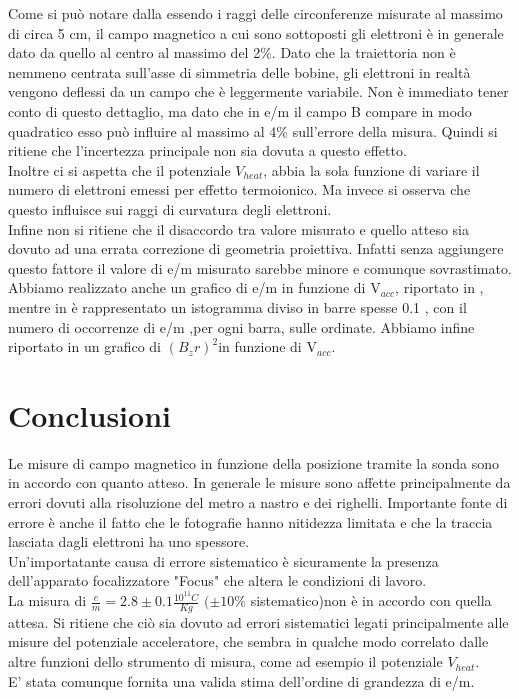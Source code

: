 Come si può notare dalla  essendo i raggi delle circonferenze misurate al massimo di circa 5 cm, il campo magnetico a cui sono sottoposti gli elettroni è in generale dato da quello al centro al massimo del 2\%. Dato che la traiettoria non è nemmeno centrata sull'asse di simmetria delle bobine, gli elettroni in realtà vengono deflessi da un campo che è leggermente variabile. Non è immediato tener conto di questo dettaglio, ma dato che in e/m il campo B compare in modo quadratico esso può influire al massimo al 4\% sull'errore della misura. Quindi si ritiene che l'incertezza principale non sia dovuta a questo effetto. \\
Inoltre ci si aspetta che il potenziale $V_{heat}$, abbia la sola funzione di variare il numero di elettroni emessi per effetto termoionico. Ma invece si osserva che questo influisce sui raggi di curvatura degli elettroni.\\
Infine non si ritiene che il disaccordo tra valore misurato e quello atteso sia dovuto ad una errata correzione di geometria proiettiva. Infatti senza aggiungere questo fattore il valore di e/m misurato sarebbe minore e comunque sovrastimato.
Abbiamo realizzato anche un grafico di e/m in funzione di V$_{acc}$, riportato in , mentre in  è rappresentato un istogramma diviso in barre spesse 0.1 , con il numero di occorrenze di e/m ,per ogni barra, sulle ordinate. Abbiamo infine riportato in  un grafico di ${(B_z r)}^2$in funzione di V$_{acc}$.

\section{Conclusioni}
Le misure di campo magnetico in funzione della posizione tramite la sonda sono in accordo con quanto atteso.
In generale le misure sono affette principalmente da errori dovuti alla risoluzione del metro a nastro e dei righelli. Importante fonte di errore è anche il fatto che le fotografie hanno nitidezza limitata e che la traccia lasciata dagli elettroni ha uno spessore.\\
Un'importatante causa di errore sistematico è sicuramente la presenza dell'apparato focalizzatore "Focus" che altera le condizioni di lavoro.\\
La misura di $\frac{e}{m} = 2.8 \pm 0.1 \frac{10^{11} C}{Kg}$ $(\pm 10\%$ sistematico)non è in accordo con quella attesa. Si ritiene che ciò sia dovuto ad errori sistematici legati principalmente alle misure del potenziale acceleratore, che sembra in qualche modo correlato dalle altre funzioni dello strumento di misura, come ad esempio il potenziale $V_{heat}$.\\
E' stata comunque fornita una valida stima dell'ordine di grandezza di e/m.